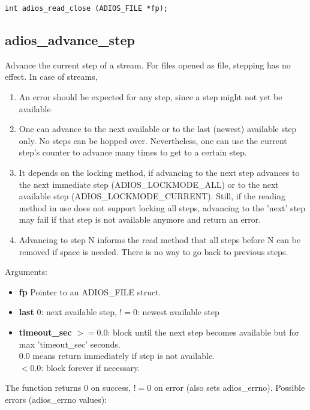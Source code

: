 \begin{lstlisting}[alsolanguage=C]
int adios_read_close (ADIOS_FILE *fp);

\end{lstlisting}

\subsection{adios\_advance\_step}
Advance the current step of a stream. For files opened as file, stepping has no effect.
In case of streams, 

\begin{enumerate}
\item An error should be expected for any step, since a step might not yet be available 

\item One can advance to the next available or to the last (newest) available step only. 
No steps can be hopped over. Nevertheless, one can use the current step's counter to advance 
many times to get to a certain step. 

\item It depends on the locking method, if advancing to the next step advances to the next
immediate step (ADIOS\_LOCKMODE\_ALL) or to the next available step (ADIOS\_LOCKMODE\_CURRENT). 
Still, if the reading method in use does not support locking all steps, advancing to the 'next' step may fail 
if that step is not available anymore and return an error. 

\item Advancing to step N informs the read method that all steps 
before N can be removed if space is needed. There is no way to go back to previous steps.
\end{enumerate}

\noindent Arguments:
\begin{itemize}
\item{\bf fp}       Pointer to an ADIOS\_FILE struct.
\item{\bf last}     $0$: next available step, $!=0$: newest available step 
 \item{\bf timeout\_sec}  $>=0.0$: block until the next step becomes available but 
for max 'timeout\_sec' seconds.\\
$0.0$ means return immediately if step is not available.\\
$<0.0$: block forever if necessary.
\end{itemize}

\noindent The function returns 0 on success, $!=0$ on error (also sets adios\_errno).
Possible errors (adios\_errno values):

